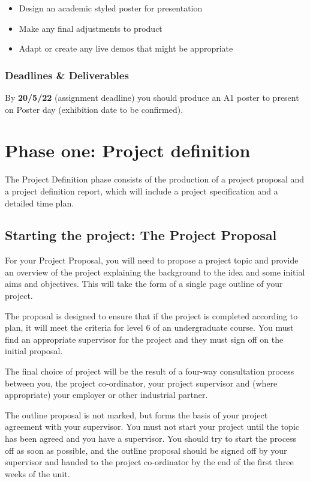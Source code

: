 \begin{itemize}
    \item Design an academic styled poster for presentation
    \item Make any final adjustments to product
    \item Adapt or create any live demos that might be appropriate
\end{itemize}

\subsubsection{Deadlines \& Deliverables}

By \textbf{20/5/22} (assignment deadline) you should produce an A1 poster to present on Poster day (exhibition date to be confirmed).

\section{Phase one: Project definition}

The Project Definition phase consists of the production of a project proposal and a project definition report, which will include a project specification and a detailed time plan.

\subsection{Starting the project: The Project Proposal}

For your Project Proposal, you will need to propose a project topic and provide an
overview of the project explaining the background to the idea and some initial aims and objectives. This will take the form of a single page outline of your project.

The proposal is designed to ensure that if the project is completed according to plan, it will meet the criteria for level 6 of an undergraduate course. You must find an appropriate supervisor for the project and they must sign off on the initial proposal.

The final choice of project will be the result of a four-way consultation process between you, the project co-ordinator, your project supervisor and (where  appropriate) your employer or other industrial partner.

The outline proposal is not marked, but forms the basis of your project agreement with your supervisor. You must not start your project until the topic has been agreed and you have a supervisor. You should try to start the process off as soon as possible, and the outline proposal should be signed off by your supervisor and handed to the project co-ordinator by the end of the first three weeks of the unit.

